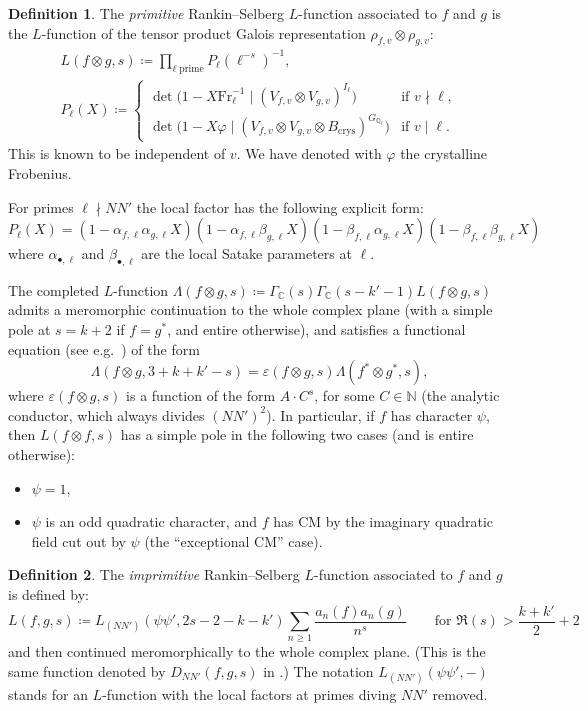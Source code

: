 \documentclass[11pt, a4paper, reqno]{amsart}
\theoremstyle{definition}
\newtheorem{definition}{Definition}[subsection]
\theoremstyle{plain}
\theoremstyle{remark}
\newcommand{\numberset}{\mathbb}
\newcommand{\C}{\numberset{C}}
\newcommand{\Q}{\numberset{Q}}
\newcommand{\N}{\numberset{N}}
\newcommand{\Bcrys}{B_{\mathrm{crys}}}
\renewcommand{\epsilon}{\varepsilon}
\renewcommand{\phi}{\varphi}
\newcommand{\Frob}{\mathrm{Fr}}
\renewcommand{\ge}{\geqslant}
\renewcommand{\geq}{\ge}
\begin{document}
  \begin{definition}
   The \emph{primitive} Rankin--Selberg $L$-function associated to $f$ and $g$ is the $L$-function of the tensor product Galois representation $\rho_{f,v}\otimes \rho_{g,v}$:
   \begin{gather*}
    L(f \otimes g, s) \coloneqq \prod_{\ell \; \text{prime}} P_\ell(\ell^{-s})^{-1}, \\
    P_\ell(X) \coloneqq
    \begin{cases}
     \det\bigl(1 - X\Frob_\ell^{-1} \mid (V_{f,v}\otimes V_{g,v})^{I_\ell}\bigr) &\text{if } v \nmid \ell, \\
     \det\bigl(1 - X\phi \mid (V_{f,v}\otimes V_{g,v} \otimes \Bcrys)^{G_{\Q_\ell}}\bigr) &\text{if } v \mid \ell.
    \end{cases}
   \end{gather*}
   This is known to be independent of $v$. We have denoted with $\phi$ the crystalline Frobenius.
  \end{definition}

  For primes $\ell \nmid NN'$ the local factor has the following explicit form:
  \[
   P_\ell(X) = (1-\alpha_{f,\ell}\alpha_{g,\ell}X)(1-\alpha_{f,\ell}\beta_{g,\ell}X)(1-\beta_{f,\ell}\alpha_{g,\ell}X)(1-\beta_{f,\ell}\beta_{g,\ell}X)
  \]
  where $\alpha_{\bullet,\ell}$ and $\beta_{\bullet,\ell}$ are the local Satake parameters at $\ell$.

  The completed $L$-function $\Lambda(f \otimes g, s) \coloneqq \Gamma_{\C}(s) \Gamma_{\C}(s - k' - 1) L(f \otimes g, s)$ admits a meromorphic continuation to the whole complex plane (with a simple pole at $s = k + 2$ if $f = g^*$, and entire otherwise), and satisfies a functional equation (see e.g.~\cite[\S 19]{jacquet72}) of the form
  \[ \Lambda(f\otimes g, 3 + k + k' -s) = \epsilon(f \otimes g, s) \Lambda(f^* \otimes g^*, s), \]
  where $\epsilon(f \otimes g, s)$ is a function of the form $A \cdot C^s$, for some $C \in \N$ (the analytic conductor, which always divides $(NN')^2$). In particular, if $f$ has character $\psi$, then $L(f \otimes f, s)$ has a simple pole in the following two cases (and is entire otherwise):
  \begin{itemize}
  \item $\psi = 1$,
  \item $\psi$ is an odd quadratic character, and $f$ has CM by the imaginary quadratic field cut out by $\psi$ (the ``exceptional CM'' case).
  \end{itemize}

  \begin{definition}
   The \emph{imprimitive} Rankin--Selberg $L$-function associated to $f$ and $g$ is defined by:
   \[
    L(f,g,s) \coloneqq L_{(N N')}(\psi\psi',2s-2-k-k')\sum_{n\geq 1} \frac{a_n(f)a_n(g)}{n^s} \qquad \text{for $\Re(s) > \frac{k + k'}{2} + 2$}
   \]
   and then continued meromorphically to the whole complex plane. (This is the same function denoted by $D_{NN'}(f, g, s)$ in \cite{Dasgupta-factorization}.) The notation $L_{(N N')}(\psi \psi', -)$ stands for an $L$-function with the local factors at primes diving $NN'$ removed.
  \end{definition}
\end{document}
